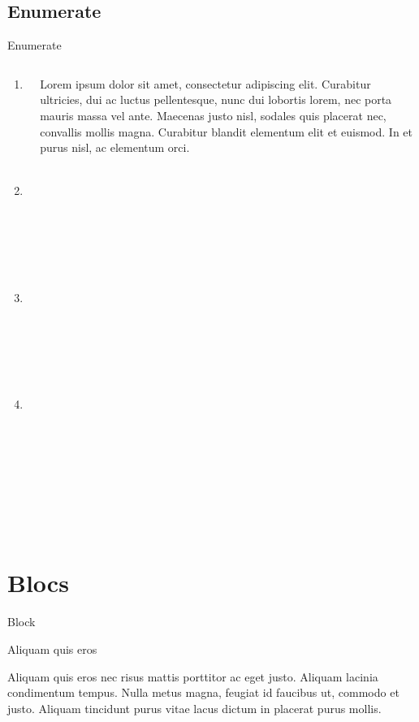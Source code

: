 \subsection{Enumerate}
\begin{frame}{Enumerate}
\begin{columns}
  \begin{column}{0.49\paperwidth}
      \begin{enumerate}
        \item Lorem ;
        \item<2-> Ipsum ;
        \item<2-> Dolor ;
        \item<2-> Sit amet.
      \end{enumerate}
  \end{column}

  \begin{column}{0.49\paperwidth}
    Lorem ipsum dolor sit amet, consectetur adipiscing elit. Curabitur 
    ultricies, dui ac luctus pellentesque, nunc dui lobortis lorem, nec 
    porta mauris massa vel ante. Maecenas justo nisl, sodales quis 
    placerat nec, convallis mollis magna. Curabitur blandit elementum 
    elit et euismod. In et purus nisl, ac elementum orci.
  \end{column}
\end{columns}

\end{frame}

\section{Blocs}
\begin{frame}{}
\end{frame}

\begin{frame}{Block}
  \begin{block}{Aliquam quis eros}

    Aliquam quis eros nec risus mattis porttitor ac eget justo. 
    Aliquam lacinia condimentum tempus. Nulla metus magna, feugiat 
    id faucibus ut, commodo et justo. Aliquam tincidunt purus vitae 
    lacus dictum in placerat purus mollis. 

  \end{block}
\end{frame}


